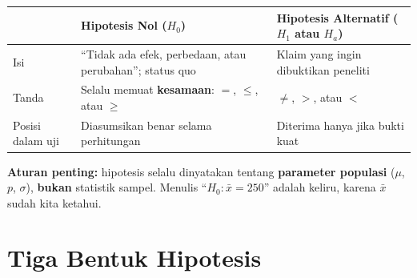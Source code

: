 \documentclass[
  indonesian,
  letterpaper,
]{book}
\newcounter{none} %
\begin{document}
{\def\LTcaptype{none} %
\begin{longtable}[]{@{}
  >{\raggedright\arraybackslash}p{}
  >{\raggedright\arraybackslash}p{}
  >{\raggedright\arraybackslash}p{}@{}}
\toprule\noalign{}
\begin{minipage}[b]{\linewidth}\raggedright
\end{minipage} & \begin{minipage}[b]{\linewidth}\raggedright
Hipotesis Nol (\(H_0\))
\end{minipage} & \begin{minipage}[b]{\linewidth}\raggedright
Hipotesis Alternatif (\(H_1\) atau \(H_a\))
\end{minipage} \\
\midrule\noalign{}
\endhead
\bottomrule\noalign{}
\endlastfoot
Isi & ``Tidak ada efek, perbedaan, atau perubahan''; status quo & Klaim
yang ingin dibuktikan peneliti \\
Tanda & Selalu memuat \textbf{kesamaan}: \(=\), \(\leq\), atau \(\geq\)
& \(\neq\), \(>\), atau \(<\) \\
Posisi dalam uji & Diasumsikan benar selama perhitungan & Diterima hanya
jika bukti kuat \\
\end{longtable}
}

\textbf{Aturan penting:} hipotesis selalu dinyatakan tentang
\textbf{parameter populasi} (\(\mu\), \(p\), \(\sigma\)), \textbf{bukan}
statistik sampel. Menulis ``\(H_0: \bar{x} = 250\)'' adalah keliru,
karena \(\bar{x}\) sudah kita ketahui.

\section{Tiga Bentuk Hipotesis}\label{tiga-bentuk-hipotesis}
\end{document}
